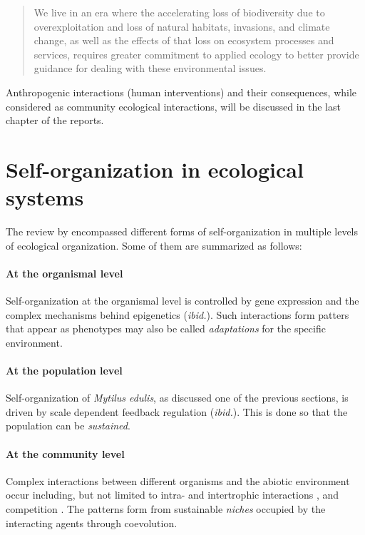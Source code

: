 \begin{quote}
We live in an era where the accelerating loss of biodiversity due to overexploitation and loss of natural habitats, invasions, and climate change, as well as the effects of that loss on ecosystem processes and services, requires greater commitment to applied ecology to better provide guidance for dealing with these environmental issues.
\end{quote}

Anthropogenic interactions (human interventions) and their consequences, while considered as community ecological interactions, will be discussed in the last chapter of the reports.

\section{Self-organization in ecological systems}

The review by  encompassed different forms of self-organization in multiple levels of ecological organization.
Some of them are summarized as follows:

\paragraph{At the organismal level}
Self-organization at the organismal level is controlled by gene expression and the complex mechanisms behind epigenetics (\textit{ibid.}).
Such interactions form patters that appear as phenotypes may also be called \emph{adaptations} for the specific environment.

\paragraph{At the population level}
Self-organization of \textit{Mytilus edulis}, as discussed one of the previous sections, is driven by scale dependent feedback regulation (\textit{ibid.}).
This is done so that the population can be \emph{sustained}.

\paragraph{At the community level}
Complex interactions between different organisms and the abiotic environment occur including, but not limited to intra- and intertrophic interactions \cite{Seibold2018}, and competition \cite{Dong2019}.
The patterns form from sustainable \emph{niches} occupied by the interacting agents through coevolution.

